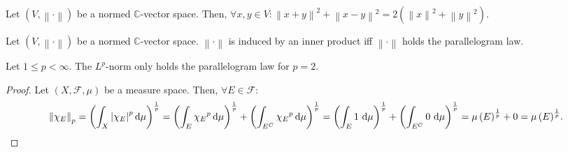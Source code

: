 \begin{frame}

	\begin{theorem}
		Let $\left(V,\left\|\cdot\right\|\right)$ be a normed
		$\mathds{C}$-vector space.
		Then,
		\begin{math}
			\forall x,y\in V:
			{\left\|x+y\right\|}^{2}+
			{\left\|x-y\right\|}^{2}
			=
			2\left(
			{\left\|x\right\|}^{2}
			+
			{\left\|y\right\|}^{2}
			\right)%
		\end{math}.
	\end{theorem}

	\begin{theorem}
		Let $\left(V,\left\|\cdot\right\|\right)$ be a normed
		$\mathds{C}$-vector space.
		$\left\|\cdot\right\|$ is induced by an inner product iff
		$\left\|\cdot\right\|$ holds the \alert{parallelogram law}.
	\end{theorem}

	\begin{theorem}
		Let $1\leq p<\infty$.
		The $L^{p}$-norm only holds the parallelogram law for $p=2$.
	\end{theorem}

	\begin{proof}
		Let $\left(X,\mathcal{F},\mu\right)$ be a measure space.
		Then, $\forall E\in\mathcal{F}$:
		\begin{equation*}
			{\left\|
			{\chi}_{E}
			\right\|}_{p}
				=
				{\left(
					\int_{X}
					{\left|\chi_{E}\right|}^{p}
					\dl\mu
					\right)}^{\frac{1}{p}}
				=
				{\left(
					\int_{E}
					{\chi_{E}}^{p}
					\dl\mu
					\right)}^{\frac{1}{p}}
			+
			{\left(
			\int_{E^{C}}
			{\chi_{E}}^{p}
			\dl\mu
			\right)}^{\frac{1}{p}}
				=
				{\left(
					\int_{E}
					1\,
					\dl\mu
					\right)}^{\frac{1}{p}}
			+
			{\left(
			\int_{E^{C}}
			0\,
			\dl\mu
			\right)}^{\frac{1}{p}}
				=
				{\mu\left(E\right)}^{\frac{1}{p}}+
			0
			=
			{\mu\left(E\right)}^{\frac{1}{p}}.
		\end{equation*}


\end{proof}
\end{frame}
